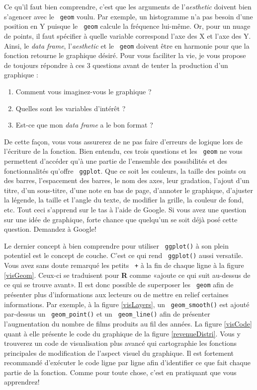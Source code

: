 \documentclass[10.5pt,a4paper]{article}
\newcommand{\rcode}[1]{\texttt{\color{rstudio} #1}}
\begin{document}
  Ce qu'il faut bien comprendre, c'est que les arguments de l'\textit{aesthetic} doivent bien s'agencer avec le \rcode{geom} voulu. Par exemple, un histogramme n'a pas besoin d'une position en Y puisque le \rcode{geom} calcule la fréquence lui-même. Or, pour un nuage de points, il faut spécifier à quelle variable correspond l'axe des X et l'axe des Y. Ainsi, le \emph{data frame}, l'\textit{aesthetic} et le \rcode{geom} doivent être en harmonie pour que la fonction retourne le graphique désiré. Pour vous faciliter la vie, je vous propose de toujours répondre à ces 3 questions avant de tenter la production d'un graphique : 
  \begin{enumerate}
  \item Comment vous imaginez-vous le graphique ? 
  \item Quelles sont les variables d'intérêt ?
  \item Est-ce que mon \emph{data frame} a le bon format ?
  \end{enumerate}
  De cette façon, vous vous assurerez de ne pas faire d'erreurs de logique lors de l'écriture de la fonction. Bien entendu, ces trois questions et les \rcode{geom} ne vous permettent d'accéder qu'à une partie de l'ensemble des possibilités et des fonctionnalités qu'offre \rcode{ggplot}. Que ce soit les couleurs, la taille des points ou des barres, l'espacement des barres, le nom des axes, leur gradation, l'ajout d'un titre, d'un sous-titre, d'une note en bas de page, d'annoter le graphique, d'ajuster la légende, la taille et l'angle du texte, de modifier la grille, la couleur de fond, etc. Tout ceci s'apprend sur le tas à l'aide de Google. Si vous avez une question sur une idée de graphique, forte chance que quelqu'un se soit déjà posé cette question. Demandez à Google!
  
  Le dernier concept à bien comprendre pour utiliser \rcode{ggplot()} à son plein potentiel est le concept de couche. C'est ce qui rend \rcode{ggplot()} aussi versatile. Vous avez sans doute remarqué les petits \rcode{+} à la fin de chaque ligne à la figure \ref{visGeom}. Ceux-ci se traduisent pour \textbf{R} comme «ajoute ce qui suit au-dessus de ce qui se trouve avant». Il est donc possible de superposer les \rcode{geom} afin de présenter plus d'informations aux lecteurs ou de mettre en relief certaines informations. Par exemple, à la figure \ref{visLayers}, un \rcode{geom\_smooth()} est ajouté par-dessus un \rcode{geom\_point()} et un \rcode{geom\_line()} afin de présenter l'augmentation du nombre de films produits au fil des années. La figure \ref{visCode} quant à elle présente le code du graphique de la figure \ref{revenueDistri}. Vous y trouverez un code de visualisation plus avancé qui cartographie les fonctions principales de modification de l'aspect visuel du graphique. Il est fortement recommandé d'exécuter le code ligne par ligne afin d'identifier ce que fait chaque partie de la fonction. Comme pour toute chose, c'est en pratiquant que vous apprendrez! 
  
\end{document}
